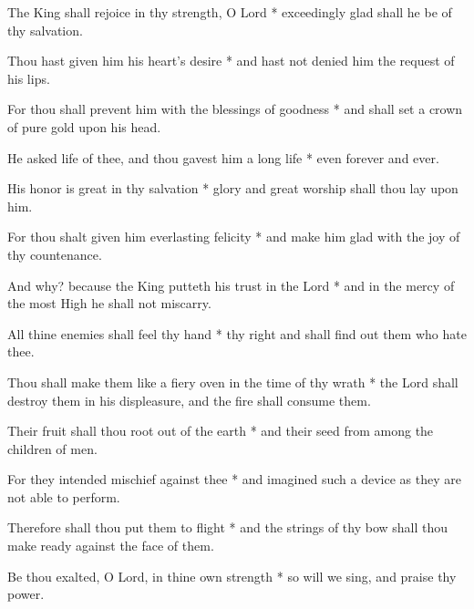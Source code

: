 The King shall rejoice in thy strength, O Lord * exceedingly glad shall he be of thy salvation.

Thou hast given him his heart's desire * and hast not denied him the request of his lips.

For thou shall prevent him with the blessings of goodness * and shall set a crown of pure gold upon his head.

He asked life of thee, and thou gavest him a long life * even forever and ever.

His honor is great in thy salvation * glory and great worship shall thou lay upon him.

For thou shalt given him everlasting felicity * and make him glad with the joy of thy countenance.

And why? because the King putteth his trust in the Lord * and in the mercy of the most High he shall not miscarry.

All thine enemies shall feel thy hand * thy right and shall find out them who hate thee.

Thou shall make them like a fiery oven in the time of thy wrath * the Lord shall destroy them in his displeasure, and the fire shall consume them.

Their fruit shall thou root out of the earth * and their seed from among the children of men.

For they intended mischief against thee * and imagined such a device as they are not able to perform.

Therefore shall thou put them to flight * and the strings of thy bow shall thou make ready against the face of them.

Be thou exalted, O Lord, in thine own strength * so will we sing, and praise thy power.